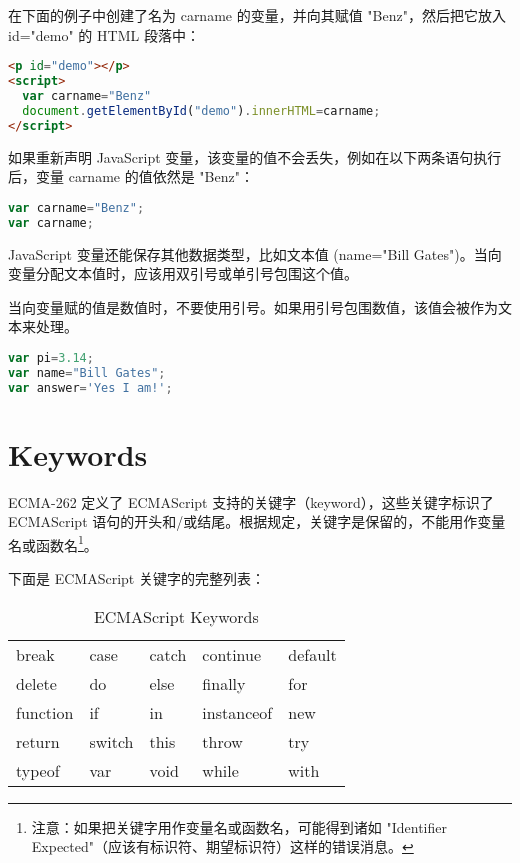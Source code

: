 在下面的例子中创建了名为 carname 的变量，并向其赋值 "Benz"，然后把它放入 id="demo" 的 HTML 段落中：

\begin{lstlisting}[language=HTML]
<p id="demo"></p>
<script>
  var carname="Benz"
  document.getElementById("demo").innerHTML=carname;
</script>
\end{lstlisting}

如果重新声明 JavaScript 变量，该变量的值不会丢失，例如在以下两条语句执行后，变量 carname 的值依然是 "Benz"：

\begin{lstlisting}[language=JavaScript]
var carname="Benz";
var carname;
\end{lstlisting}




JavaScript 变量还能保存其他数据类型，比如文本值 (name="Bill Gates")。当向变量分配文本值时，应该用双引号或单引号包围这个值。

当向变量赋的值是数值时，不要使用引号。如果用引号包围数值，该值会被作为文本来处理。


\begin{lstlisting}[language=JavaScript]
var pi=3.14;
var name="Bill Gates";
var answer='Yes I am!';
\end{lstlisting}





\chapter{Keywords}



ECMA-262 定义了 ECMAScript 支持的关键字（keyword），这些关键字标识了 ECMAScript 语句的开头和/或结尾。根据规定，关键字是保留的，不能用作变量名或函数名\footnote{注意：如果把关键字用作变量名或函数名，可能得到诸如 "Identifier Expected"（应该有标识符、期望标识符）这样的错误消息。}。

下面是 ECMAScript 关键字的完整列表：



\begin{table}[htbp]
\centering
\caption{ECMAScript Keywords}
\label{ecmascrpit_keywords}
\begin{tabular}{m{65pt}m{65pt}m{65pt}m{65pt}m{65pt}}
break	&case	&catch	&continue	&default\\
delete	&do	&else	&finally		&for\\
function	&if		&in		&instanceof	&new\\
return	&switch&this	&throw		&try\\
typeof	&var	&void	&while		&with\\
\end{tabular}
\end{table}



